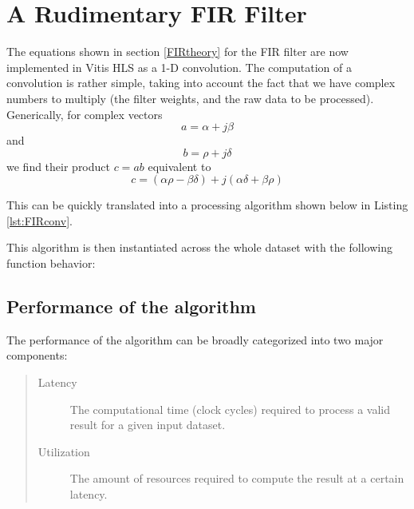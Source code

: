 \documentclass[11pt]{report}
\begin{document}
\chapter{A Rudimentary \ac{FIR} Filter}
The equations shown in section \ref{FIRtheory} for the FIR filter are now implemented in Vitis HLS as a 1-D convolution. The computation of a convolution is rather simple, taking into account the fact that we have complex numbers to multiply (the filter weights, and the raw data to be processed). Generically, for complex vectors
\begin{equation}
	a = \alpha + j\beta
\end{equation}
and 
\begin{equation}
	b = \rho + j\delta
\end{equation}
we find their product $c = ab$ equivalent to
\begin{equation}
	c = (\alpha\rho - \beta\delta) + j(\alpha\delta+\beta\rho)
\end{equation}

This can be quickly translated into a processing algorithm shown below in Listing \ref{lst:FIRconv}.

\begin{singlespace}
    
\end{singlespace}

This algorithm is then instantiated across the whole dataset with the following function behavior:

\begin{singlespace}
    
\end{singlespace}

\section{Performance of the algorithm}
The performance of the algorithm can be broadly categorized into two major components:

\begin{quote}
\begin{description}
	\item [Latency] The computational time (clock cycles) required to process a valid result for a given input dataset.
	\item [Utilization] The amount of resources required to compute the result at a certain latency.
\end{description}
\end{quote}
\end{document}
